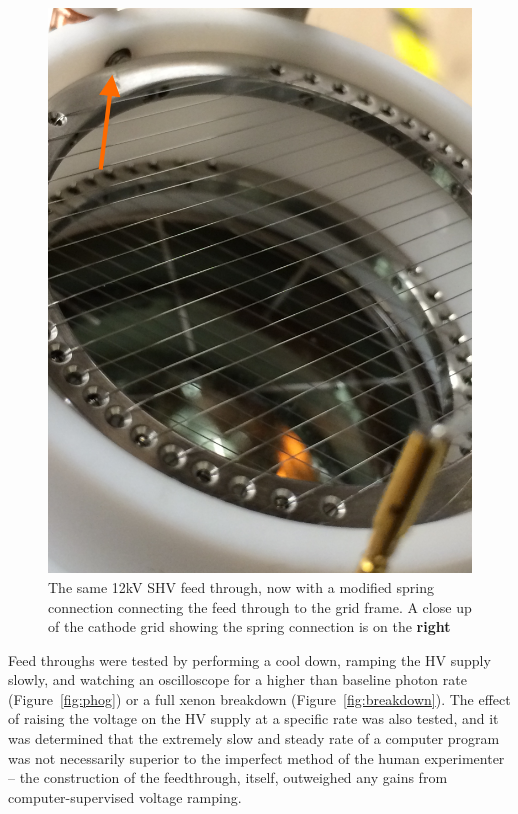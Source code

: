 \begin{figure}[htbp]
\begin{center}
\includegraphics[width=\halffig]{figures/testbed/ft2_2.jpg}
\caption{The same 12kV SHV feed through, now with a modified spring connection connecting the feed through to the grid frame. A close up of the cathode grid showing the spring connection is on the \textbf{right}}
\label{fig:ft2_1}
\end{center}
\end{figure}


Feed throughs were tested by performing a cool down, ramping the \ac{HV} supply slowly, and watching an oscilloscope for a higher than baseline photon rate (Figure~\ref{fig:phog}) or a full xenon breakdown (Figure~\ref{fig:breakdown}). The effect of raising the voltage on the \ac{HV} supply at a specific rate was also tested, and it was determined that the extremely slow and steady rate of a computer program was not necessarily superior to the imperfect method of the human experimenter -- the construction of the feedthrough, itself, outweighed any gains from computer-supervised voltage ramping.  


